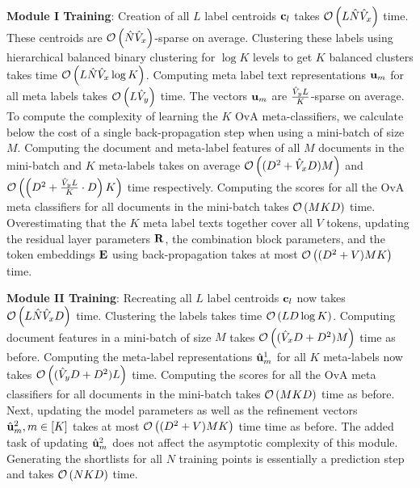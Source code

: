 \textbf{Module I Training}: Creation of all $L$ label centroids $\protect{\mathbf{c}}_l$ takes ${\mathcal O}\left({{L\hat N\hat V_x}}\right)$ time. These centroids are ${\mathcal O}\left({{\hat N\hat V_x}}\right)$-sparse on average. Clustering these labels using hierarchical balanced binary clustering for $\log K$ levels to get $K$ balanced clusters takes time ${\mathcal O}\left({{L\hat N\hat V_x\log K}}\right)$. Computing meta label text representations $\protect{\mathbf{u}}_m$ for all meta labels takes ${\mathcal O}\left({{L\hat V_y}}\right)$ time. The vectors $\protect{\mathbf{u}}_m$ are $\frac{\hat V_y L}K$-sparse on average. To compute the complexity of learning the $K$ OvA meta-classifiers, we calculate below the cost of a single back-propagation step when using a mini-batch of size $M$. Computing the document and meta-label features of all $M$ documents in the mini-batch and $K$ meta-labels takes on average ${\mathcal O}\left({{(D^2 + \hat V_x D)M}}\right)$ and ${\mathcal O}\left({{\left({D^2 + \frac{\hat V_y L}K\cdot D}\right)K}}\right)$ time respectively. Computing the scores for all the OvA meta classifiers for all documents in the mini-batch takes ${\mathcal O}\left({{MKD}}\right)$ time. Overestimating that the $K$ meta label texts together cover all $V$ tokens, updating the residual layer parameters $\protect{\mathbf{R}}$, the combination block parameters, and the token embeddings $\protect{\mathbf{E}}$ using back-propagation takes at most ${\mathcal O}\left({{(D^2 + V)MK}}\right)$ time.



\textbf{Module II Training}: Recreating all $L$ label centroids $\protect{\mathbf{c}}_l$ now takes ${\mathcal O}\left({{L\hat N\hat V_x D}}\right)$ time. Clustering the labels takes time ${\mathcal O}\left({{LD\log K}}\right)$. Computing document features in a mini-batch of size $M$ takes ${\mathcal O}\left({{(\hat V_x D + D^2)M}}\right)$ time as before. Computing the meta-label representations $\hat{\protect{\mathbf{u}}}^1_m$ for all $K$ meta-labels now takes ${\mathcal O}\left({{(\hat V_y D + D^2)L}}\right)$ time. Computing the scores for all the OvA meta classifiers for all documents in the mini-batch takes ${\mathcal O}\left({{MKD}}\right)$ time as before. Next, updating the model parameters as well as the refinement vectors $\hat{\protect{\mathbf{u}}}^2_m, m \in [K]$ takes at most ${\mathcal O}\left({{(D^2 + V)MK}}\right)$ time time as before. The added task of updating $\hat{\protect{\mathbf{u}}}^2_m$ does not affect the asymptotic complexity of this module. Generating the shortlists for all $N$ training points is essentially a prediction step and takes ${\mathcal O}\left({{NKD}}\right)$ time.

